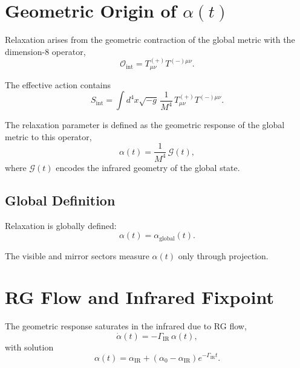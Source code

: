 \documentclass[11pt,a4paper]{article}
\begin{document}
\section[Geometric Origin of alpha(t)]{Geometric Origin of $\alpha(t)$}

Relaxation arises from the geometric contraction of the global metric with the
dimension-8 operator,
\begin{equation}
\mathcal{O}_{\mathrm{int}} = T^{(+)}_{\mu\nu} T^{(-)\mu\nu}.
\end{equation}

The effective action contains
\begin{equation}
S_{\mathrm{int}}
=
\int d^4x \sqrt{-g} \,
\frac{1}{M^4} \,
T^{(+)}_{\mu\nu} T^{(-)\mu\nu}.
\label{eq:dim8action}
\end{equation}

The relaxation parameter is defined as the geometric response of the global
metric to this operator,
\begin{equation}
\alpha(t) = \frac{1}{M^4} \, \mathcal{G}(t),
\end{equation}
where $\mathcal{G}(t)$ encodes the infrared geometry of the global state.

\subsection[Global Definition]{Global Definition}

Relaxation is globally defined:
\begin{equation}
\alpha(t) = \alpha_{\mathrm{global}}(t).
\end{equation}

The visible and mirror sectors measure $\alpha(t)$ only through projection.

\section[RG Flow and Infrared Fixpoint]{RG Flow and Infrared Fixpoint}

The geometric response saturates in the infrared due to RG flow,
\begin{equation}
\dot{\alpha}(t) = - \Gamma_{\mathrm{IR}} \, \alpha(t),
\end{equation}
with solution
\begin{equation}
\alpha(t) = \alpha_{\mathrm{IR}}
+
\left( \alpha_0 - \alpha_{\mathrm{IR}} \right)
e^{-\Gamma_{\mathrm{IR}} t}.
\end{equation}
\end{document}
